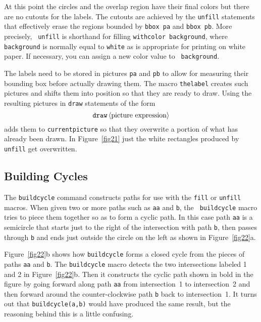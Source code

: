 \documentclass{article} %
\newcommand\descr[1]{{\langle\hbox{#1}\rangle}}
\begin{document}
At this point the circles and the overlap region have their final colors
but there are no cutouts for the labels.  The cutouts are achieved by
the {\tt unfill}\label{Dunfill} statements
that effectively erase the regions bounded by {\tt bbox
pa} and {\tt bbox pb}.  More precisely, {\tt
unfill} is shorthand for filling {\tt withcolor background}, where {\tt
background} is normally equal to {\tt white} as is appropriate for
printing on white paper.  If necessary, you can assign a new color value
to {\tt
background}\label{Dbground}.

The labels need to be stored in pictures {\tt pa} and {\tt pb} to allow
for measuring their bounding box before actually drawing them.  The
macro {\tt thelabel} creates such
pictures and shifts them into position so that they are ready to draw.
Using the resulting pictures in {\tt draw} statements of the
form
$$ {\tt draw}\, \descr{picture expression} $$
adds them to {\tt currentpicture}
so that they overwrite a portion of what has
already been drawn.  In Figure~\ref{fig21} just the white rectangles produced by
{\tt unfill} get overwritten.

\subsection{Building Cycles}
\label{buildcy}

The {\tt buildcycle} command
constructs paths for use with the {\tt fill} or {\tt unfill} macros.
When given two or more paths such as {\tt aa} and {\tt b}, the {\tt
buildcycle} macro tries to piece them together so as to form a cyclic
path.  In this case path {\tt aa} is a semicircle that starts just to
the right of the intersection with path {\tt b}, then passes through
{\tt b} and ends just outside the circle on the left as shown in
Figure~\ref{fig22}a.

Figure~\ref{fig22}b shows how {\tt buildcycle} forms a closed cycle from
the pieces of paths {\tt aa} and {\tt b}.  The {\tt buildcycle} macro
detects the two intersections labeled 1 and 2 in
Figure~\ref{fig22}b.  Then it constructs the cyclic path shown in bold
in the figure by going forward along path {\tt aa} from intersection~1
to intersection~2 and then forward around the counter-clockwise path
{\tt b} back to intersection~1.  It turns out that {\tt buildcycle(a,b)}
would have produced the same result, but the reasoning behind this is a
little confusing.
\end{document}
